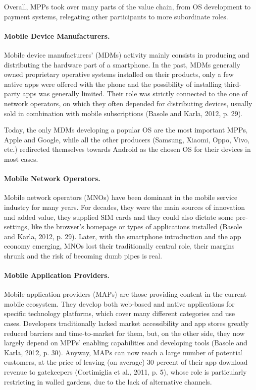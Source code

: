 Overall, MPPs took over many parts of the value chain, from OS development to payment systems, relegating other participants to more subordinate roles.


\paragraph{Mobile Device Manufacturers.}
Mobile device manufacturers' (MDMs) activity mainly consists in producing and distributing the hardware part of a smartphone. In the past, MDMs generally owned proprietary operative systems installed on their products, only a few native apps were offered with the phone and the possibility of installing third-party apps was generally limited. Their role was strictly connected to the one of network operators, on which they often depended for distributing devices, usually sold in combination with mobile subscriptions (Basole and Karla, 2012, p. 29). 

Today, the only MDMs developing a popular OS are the most important MPPs, Apple and Google, while all the other producers (Samsung, Xiaomi, Oppo, Vivo, etc.) redirected themselves towards Android as the chosen OS for their devices in most cases.


\paragraph{Mobile Network Operators.}
Mobile network operators (MNOs) have been dominant in the mobile service industry for many years. For decades, they were the main sources of innovation and added value, they supplied SIM cards and they could also dictate some pre-settings, like the browser's homepage or types of applications installed (Basole and Karla, 2012, p. 29). Later, with the smartphone introduction and the app economy emerging, MNOs lost their traditionally central role, their margins shrunk and the risk of becoming dumb pipes is real.


\paragraph{Mobile Application Providers.}
Mobile application providers (MAPs) are those providing content in the current mobile ecosystem. They develop both web-based and native applications for specific technology platforms, which cover many different categories and use cases. Developers traditionally lacked market accessibility and app stores greatly reduced barriers and time-to-market for them, but, on the other side, they now largely depend on MPPs' enabling capabilities and developing tools (Basole and Karla, 2012, p. 30). Anyway, MAPs can now reach a large number of potential customers, at the price of leaving (on average) 30 percent of their app download revenue to gatekeepers (Cortimiglia et al., 2011, p. 5), whose role is particularly restricting in walled gardens, due to the lack of alternative channels.


